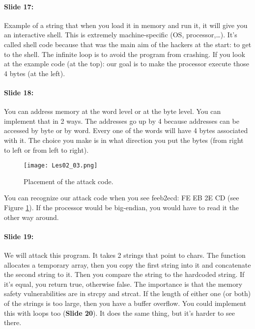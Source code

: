 \documentclass[10pt,a4paper]{report}
\begin{document}
\paragraph{Slide 17:} Example of a string that when you load it in memory and run it, it will give you an interactive shell. This is extremely machine-specific (OS, processor,…). It's called shell code because that was the main aim of the hackers at the start: to get to the shell.
The infinite loop is to avoid the program from crashing. If you look at the example code (at the top): our goal is to make the processor execute those 4 bytes (at the left).

\paragraph{Slide 18:} You can address memory at the word level or at the byte level. You can implement that in 2 ways. The addresses go up by 4 because addresses can be accessed by byte or by word. Every one of the words will have 4 bytes associated with it. The choice you make is in what direction you put the bytes (from right to left or from left to right).

\begin{figure}[ht!]
\centering
\texttt{[image: Les02\_03.png]}
\caption{Placement of the attack code.} 
\label{les02_03}
\end{figure}

You can recognize our attack code when you see feeb2ecd: FE EB 2E CD (see Figure \ref{les02_03}). If the processor would be big-endian, you would have to read it the other way around.

\paragraph{Slide 19:} We will attack this program. It takes 2 strings that point to chars. The function allocates a temporary array, then you copy the first string into it and concatenate the second string to it. Then you compare the string to the hardcoded string. If it's equal, you return true, otherwise false. The importance is that the memory safety vulnerabilities are in strcpy and strcat. If the length of either one (or both) of the strings is too large, then you have a buffer overflow. You could implement this with loops too (\textbf{Slide 20}). It does the same thing, but it's harder to see there. 
\end{document}
